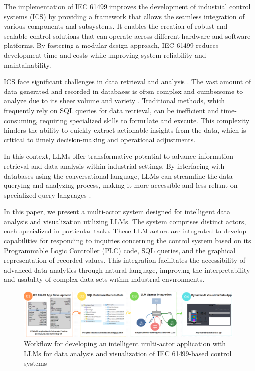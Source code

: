 \begin{bibunit}
The implementation of IEC 61499 \cite{vyatkin2009iec} improves the development of industrial control systems (ICS) by providing a framework that allows the seamless integration of various components and subsystems. It enables the creation of robust and scalable control solutions that can operate across different hardware and software platforms. By fostering a modular design approach, IEC 61499 reduces development time and costs while improving system reliability and maintainability. 

ICS face significant challenges in data retrieval and analysis \cite{cho2023dynamic}. The vast amount of data generated and recorded in databases is often complex and cumbersome to analyze due to its sheer volume and variety \cite{stojanovic2020challenges}. Traditional methods, which frequently rely on SQL queries for data retrieval, can be inefficient and time-consuming, requiring specialized skills to formulate and execute. This complexity hinders the ability to quickly extract actionable insights from the data, which is critical to timely decision-making and operational adjustments.

In this context, LLMs \cite{chang2024survey} offer transformative potential to advance information retrieval and data analysis within industrial settings. By interfacing with databases using the conversational language, LLMs can streamline the data querying and analyzing process, making it more accessible and less reliant on specialized query languages \cite{rajkumar2022evaluating}. 

In this paper, we present a multi-actor system designed for intelligent data analysis and visualization utilizing LLMs. The system comprises distinct actors, each specialized in particular tasks. These LLM actors are integrated to develop capabilities for responding to inquiries concerning the control system based on its Programmable Logic Controller (PLC) code, SQL queries, and the graphical representation of recorded values. This integration facilitates the accessibility of advanced data analytics through natural language, improving the interpretability and usability of complex data sets within industrial environments.

\begin{figure}
    \includegraphics[width=1\textwidth]{MX_Papers/Paper12/images/workflow.PNG}
    \caption{Workflow for developing an intelligent multi-actor application with LLMs for data analysis and visualization of IEC 61499-based control systems}
    \label{fig:workflow_diagram}
\end{figure}


\end{bibunit}
